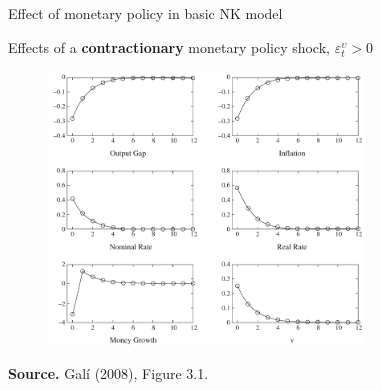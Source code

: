 \documentclass{beamer}
\begin{document}
\begin{frame}{Effect of monetary policy in basic NK model}


\begin{center}
Effects of a \textbf{contractionary} monetary policy shock, $\varepsilon^{\upsilon}_{t}>0$
\vspace{-0.1cm}
\begin{figure}[h!]
	\includegraphics[width=0.75\textwidth]{FIGURES/11_Gali_Fig3_1}
\end{figure}
\vspace{-0.2cm}
\begin{minipage}{0.5\columnwidth}
\tiny
	
\textbf{Source.} Gal\'{i} (2008), Figure 3.1.\\
\end{minipage}
\end{center}

\end{frame}
\end{document}
